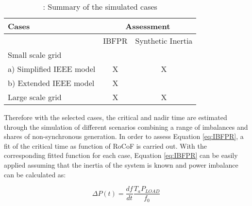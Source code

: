 \begin{table}[h]
	\caption{\label{tb:summary}: Summary of the simulated cases}
	\centering
	\begin{tabular}{lcc}
		\toprule
		\textbf{Cases}	& \multicolumn{2}{c}{\textbf{Assessment}} \\
		
		\midrule
		{}&IBFPR&	Synthetic Inertia\\
		\midrule
		Small scale grid &{} &{}\\		
		{	a) Simplified IEEE model}	& X &	X\\
		{	b) Extended IEEE model}&	X &{}\\	
		Large scale grid&	X&	X\\
		\bottomrule
	\end{tabular}
\end{table}

Therefore with the selected cases, the critical and nadir time are estimated through the simulation of different scenarios combining a range of imbalances and shares of non-synchronous generation. In order to assess Equation \eqref{eq:IBFPR}, a fit of the critical time as function of RoCoF is carried out. With the corresponding fitted function for each case, Equation \eqref{eq:IBFPR} can be easily applied assuming that the inertia of the system is known and power imbalance can be calculated as:

\begin{equation}
\Delta P(t)=\dfrac{df}{dt}\dfrac{T_aP_{LOAD}}{f_0}
\end{equation}

